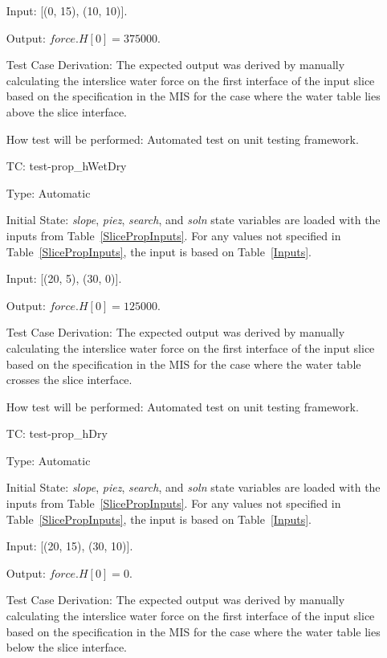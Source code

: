 \documentclass[12pt, titlepage]{article}
\newcounter{utestnum} %
\begin{document}
\begin{enumerate}[label=TC\arabic*:,ref={\arabic*}]
	Input: [(0, 15), (10, 10)].
	
	Output: $\textit{force.H}[0] = 375000$.
	
	Test Case Derivation: The expected output was derived by manually 
	calculating the interslice water force on the first interface of the input 
	slice based on the specification in the MIS for the case where the water 
	table lies above the slice interface.
	
	How test will be performed: Automated test on unit testing framework.
	
	\item [TC\refstepcounter{utestnum}\theutestnum: 
	\label{TC_PropertyHWetDry}] 
	test-prop\_hWetDry
	
	Type: Automatic
	
	Initial State: \textit{slope}, \textit{piez}, \textit{search}, and 
	\textit{soln} state variables are loaded with the inputs from 
	Table~\ref{SlicePropInputs}. For any values not specified in 
	Table~\ref{SlicePropInputs}, the input is based on Table~\ref{Inputs}.
	
	Input: [(20, 5), (30, 0)].
	
	Output: $\textit{force.H}[0] = 125000$.
	
	Test Case Derivation: The expected output was derived by manually 
	calculating the interslice water force on the first interface of the input 
	slice based on the specification in the	MIS for the case where the water 
	table crosses the slice interface.
	
	How test will be performed: Automated test on unit testing framework.
	
	\item [TC\refstepcounter{utestnum}\theutestnum: 
	\label{TC_PropertyHDry}] 
	test-prop\_hDry
	
	Type: Automatic
	
	Initial State: \textit{slope}, \textit{piez}, \textit{search}, and 
	\textit{soln} state variables are loaded with the inputs from 
	Table~\ref{SlicePropInputs}. For any values not specified in 
	Table~\ref{SlicePropInputs}, the input is based on Table~\ref{Inputs}.
	
	Input: [(20, 15), (30, 10)].
	
	Output: $\textit{force.H}[0] = 0$.
	
	Test Case Derivation: The expected output was derived by manually 
	calculating the interslice water force on the first interface of the input 
	slice based on the specification in the MIS for the case where the water 
	table lies below the slice interface.
	

\end{enumerate}
\end{document}
